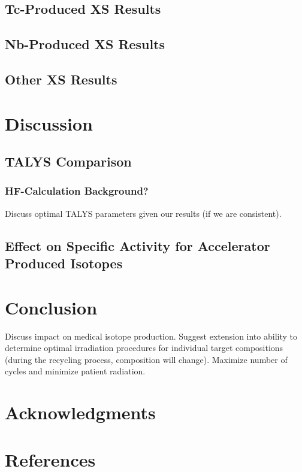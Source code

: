 \documentclass[final,3p,times,twocolumn,authoryear]{elsarticle_modified}
\begin{document}
\subsection{Tc-Produced XS Results}
\label{TcXS}
\subsection{Nb-Produced XS Results}
\label{NbXS}
\subsection{Other XS Results}
\label{PNXS}

\section{Discussion}
\label{Discussion}
\subsection{TALYS Comparison}
\label{Talys}
\subsubsection{HF-Calculation Background?}
Discuss optimal TALYS parameters given our results (if we are consistent).

\subsection{Effect on Specific Activity for Accelerator Produced Isotopes} %

\section{Conclusion}
\label{Conclusion}
Discuss impact on medical isotope production. Suggest extension into ability to determine optimal irradiation procedures for individual target compositions (during the recycling process, composition will change). Maximize number of cycles and minimize patient radiation.

\section*{Acknowledgments}
\label{Acknowledgements}


\section*{References}
\label{Ref}
\end{document}
